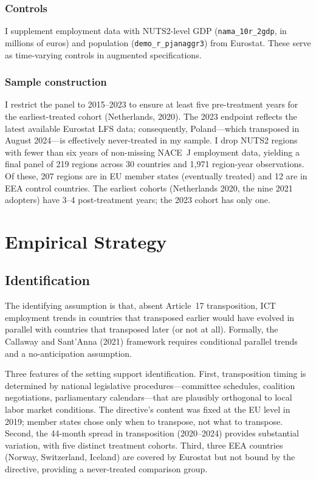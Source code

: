 \documentclass[12pt]{article}
\begin{document}
\subsubsection*{Controls} I supplement employment data with NUTS2-level GDP (\texttt{nama\_10r\_2gdp}, in millions of euros) and population (\texttt{demo\_r\_pjanaggr3}) from Eurostat. These serve as time-varying controls in augmented specifications.

\subsubsection*{Sample construction} I restrict the panel to 2015--2023 to ensure at least five pre-treatment years for the earliest-treated cohort (Netherlands, 2020). The 2023 endpoint reflects the latest available Eurostat LFS data; consequently, Poland---which transposed in August 2024---is effectively never-treated in my sample. I drop NUTS2 regions with fewer than six years of non-missing NACE~J employment data, yielding a final panel of 219 regions across 30 countries and 1,971 region-year observations. Of these, 207 regions are in EU member states (eventually treated) and 12 are in EEA control countries. The earliest cohorts (Netherlands 2020, the nine 2021 adopters) have 3--4 post-treatment years; the 2023 cohort has only one.




\section{Empirical Strategy}

\subsection{Identification}

The identifying assumption is that, absent Article~17 transposition, ICT employment trends in countries that transposed earlier would have evolved in parallel with countries that transposed later (or not at all). Formally, the Callaway and Sant'Anna (2021) framework requires conditional parallel trends and a no-anticipation assumption.

Three features of the setting support identification. First, transposition timing is determined by national legislative procedures---committee schedules, coalition negotiations, parliamentary calendars---that are plausibly orthogonal to local labor market conditions. The directive's content was fixed at the EU level in 2019; member states chose only when to transpose, not what to transpose. Second, the 44-month spread in transposition (2020--2024) provides substantial variation, with five distinct treatment cohorts. Third, three EEA countries (Norway, Switzerland, Iceland) are covered by Eurostat but not bound by the directive, providing a never-treated comparison group.
\end{document}
